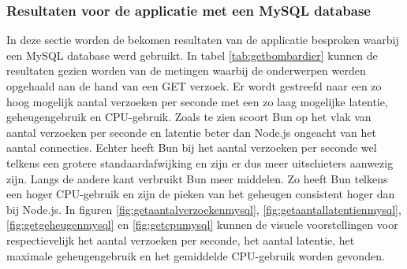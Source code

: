 \subsubsection{Resultaten voor de applicatie met een MySQL database}
In deze sectie worden de bekomen resultaten van de applicatie besproken waarbij een MySQL database werd gebruikt.
In tabel \ref{tab:getbombardier} kunnen de resultaten gezien worden van de metingen waarbij de onderwerpen werden opgehaald aan de hand van een GET verzoek.
Er wordt gestreefd naar een zo hoog mogelijk aantal verzoeken per seconde met een zo laag mogelijke latentie, geheugengebruik en CPU-gebruik.
Zoals te zien scoort Bun op het vlak van aantal verzoeken per seconde en latentie beter dan Node.js ongeacht van het aantal connecties. 
Echter heeft Bun bij het aantal verzoeken per seconde wel telkens een grotere standaardafwijking en zijn er dus meer uitschieters aanwezig zijn.
Langs de andere kant verbruikt Bun meer middelen. Zo heeft Bun telkens een hoger CPU-gebruik en zijn de pieken van het geheugen consistent hoger dan bij Node.js.
In figuren \ref{fig:getaantalverzoekenmysql}, \ref{fig:getaantallatentienmysql}, \ref{fig:getgeheugenmysql} en \ref{fig:getcpumysql} kunnen de visuele voorstellingen 
voor respectievelijk het aantal verzoeken per seconde, het aantal latentie, het maximale geheugengebruik en het gemiddelde CPU-gebruik worden gevonden.
